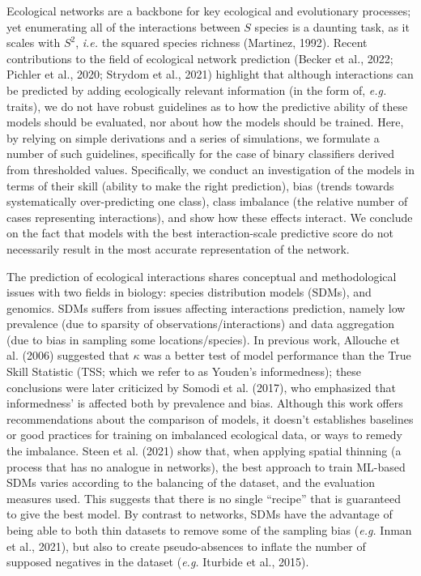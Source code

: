 \documentclass[11pt]{article}
\begin{document}
\vfill

\clearpage
\linenumbers
\pagestyle{normal}

Ecological networks are a backbone for key ecological and evolutionary
processes; yet enumerating all of the interactions between \(S\) species
is a daunting task, as it scales with \(S^2\), \emph{i.e.} the squared
species richness (Martinez, 1992). Recent contributions to the field of
ecological network prediction (Becker et al., 2022; Pichler et al.,
2020; Strydom et al., 2021) highlight that although interactions can be
predicted by adding ecologically relevant information (in the form of,
\emph{e.g.} traits), we do not have robust guidelines as to how the
predictive ability of these models should be evaluated, nor about how
the models should be trained. Here, by relying on simple derivations and
a series of simulations, we formulate a number of such guidelines,
specifically for the case of binary classifiers derived from thresholded
values. Specifically, we conduct an investigation of the models in terms
of their skill (ability to make the right prediction), bias (trends
towards systematically over-predicting one class), class imbalance (the
relative number of cases representing interactions), and show how these
effects interact. We conclude on the fact that models with the best
interaction-scale predictive score do not necessarily result in the most
accurate representation of the network.

The prediction of ecological interactions shares conceptual and
methodological issues with two fields in biology: species distribution
models (SDMs), and genomics. SDMs suffers from issues affecting
interactions prediction, namely low prevalence (due to sparsity of
observations/interactions) and data aggregation (due to bias in sampling
some locations/species). In previous work, Allouche et al. (2006)
suggested that \(\kappa\) was a better test of model performance than
the True Skill Statistic (TSS; which we refer to as Youden's
informedness); these conclusions were later criticized by Somodi et al.
(2017), who emphasized that informedness' is affected both by prevalence
and bias. Although this work offers recommendations about the comparison
of models, it doesn't establishes baselines or good practices for
training on imbalanced ecological data, or ways to remedy the imbalance.
Steen et al. (2021) show that, when applying spatial thinning (a process
that has no analogue in networks), the best approach to train ML-based
SDMs varies according to the balancing of the dataset, and the
evaluation measures used. This suggests that there is no single
``recipe'' that is guaranteed to give the best model. By contrast to
networks, SDMs have the advantage of being able to both thin datasets to
remove some of the sampling bias (\emph{e.g.} Inman et al., 2021), but
also to create pseudo-absences to inflate the number of supposed
negatives in the dataset (\emph{e.g.} Iturbide et al., 2015).
\end{document}
